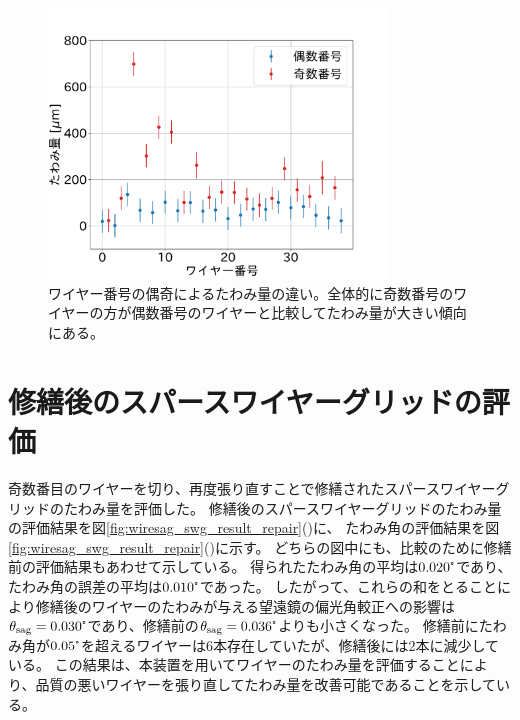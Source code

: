 \documentclass[../../main.tex]{subfiles}
\begin{document}
\begin{figure}[H]
    \centering
    \includegraphics[width=0.8\textwidth]{wiresag_swg/swg_sag_before_even_odd.pdf}
    \caption{ワイヤー番号の偶奇によるたわみ量の違い。全体的に奇数番号のワイヤーの方が偶数番号のワイヤーと比較してたわみ量が大きい傾向にある。}
    \label{fig:wiresag_swg_even_odd}    
\end{figure}

\section{修繕後のスパースワイヤーグリッドの評価}
奇数番目のワイヤーを切り、再度張り直すことで修繕されたスパースワイヤーグリッドのたわみ量を評価した。
修繕後のスパースワイヤーグリッドのたわみ量の評価結果を図\ref{fig:wiresag_swg_result_repair}()に、
たわみ角の評価結果を図\ref{fig:wiresag_swg_result_repair}()に示す。
どちらの図中にも、比較のために修繕前の評価結果もあわせて示している。
得られたたわみ角の平均は$0.020\tcdegree$であり、たわみ角の誤差の平均は$0.010\tcdegree$であった。
したがって、これらの和をとることにより修繕後のワイヤーのたわみが与える望遠鏡の偏光角較正への影響は
$\theta_{\mathrm{sag}}=0.030\tcdegree$であり、修繕前の$\theta_{\mathrm{sag}}=0.036\tcdegree$よりも小さくなった。
修繕前にたわみ角が$0.05\tcdegree$を超えるワイヤーは6本存在していたが、修繕後には2本に減少している。
この結果は、本装置を用いてワイヤーのたわみ量を評価することにより、品質の悪いワイヤーを張り直してたわみ量を改善可能であることを示している。
\end{document}
